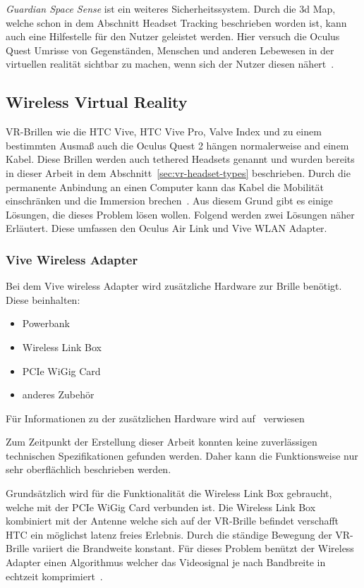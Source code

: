 \emph{Guardian Space Sense} ist ein weiteres Sicherheitssystem.
Durch die 3d Map, welche schon in dem Abschnitt Headset Tracking beschrieben worden ist, kann auch eine Hilfestelle für den Nutzer geleistet werden.
Hier versuch die Oculus Quest Umrisse von Gegenständen, Menschen und anderen Lebewesen in der virtuellen realität sichtbar zu machen, wenn sich der Nutzer diesen nähert~\cite{Oculus_Guardien}.

\subsection{Wireless Virtual Reality}

VR-Brillen wie die HTC Vive, HTC Vive Pro, Valve Index und zu einem bestimmten Ausmaß auch die Oculus Quest 2 hängen normalerweise and einem Kabel.
Diese Brillen werden auch tethered Headsets genannt und wurden bereits in dieser Arbeit in dem Abschnitt~\ref{sec:vr-headset-types} beschrieben.
Durch die permanente Anbindung an einen Computer kann das Kabel die Mobilität einschränken und die Immersion brechen~\cite{Oculus_2021}.
Aus diesem Grund gibt es einige Lösungen, die dieses Problem lösen wollen.
Folgend werden zwei Lösungen näher Erläutert.
Diese umfassen den Oculus Air Link und Vive WLAN Adapter.

\subsubsection{Vive Wireless Adapter}

Bei dem Vive wireless Adapter wird zusätzliche Hardware zur Brille benötigt.
Diese beinhalten:

\begin{itemize}
    \item Powerbank
    \item Wireless Link Box
    \item PCIe WiGig Card
    \item anderes Zubehör
\end{itemize}

Für Informationen zu der zusätzlichen Hardware wird auf~\cite{ViveWirelessAdapter} verwiesen

Zum Zeitpunkt der Erstellung dieser Arbeit konnten keine zuverlässigen technischen Spezifikationen gefunden werden.
Daher kann die Funktionsweise nur sehr oberflächlich beschrieben werden.

Grundsätzlich wird für die Funktionalität die Wireless Link Box gebraucht, welche mit der PCIe WiGig Card verbunden ist.
Die Wireless Link Box kombiniert mit der Antenne welche sich auf der VR-Brille befindet verschafft HTC ein möglichst latenz freies Erlebnis.
Durch die ständige Bewegung der VR-Brille variiert die Brandweite konstant.
Für dieses Problem benützt der Wireless Adapter einen Algorithmus welcher das Videosignal je nach Bandbreite in echtzeit komprimiert~\cite{VRConduit_2018}.

